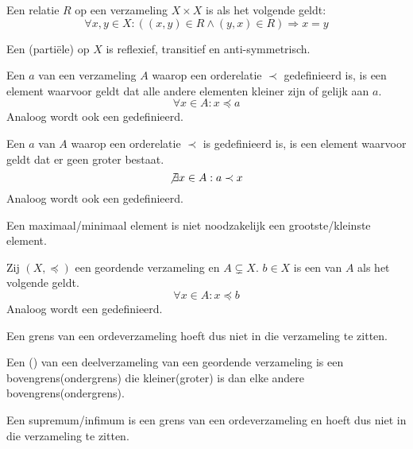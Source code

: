 \documentclass[main.tex]{subfiles}
\begin{document}
\begin{de}
  Een relatie $R$ op een verzameling $X \times X$ is  als het volgende geldt:
  \[ \forall x,y \in X: ((x,y) \in R \wedge (y,x) \in R) \Rightarrow x = y \]
\end{de}

\begin{de}
  Een (parti\"ele)  op $X$ is reflexief, transitief en anti-symmetrisch.
\end{de}

\begin{de}
  Een  $a$ van een verzameling $A$ waarop een orderelatie $\prec$ gedefinieerd is, is een element waarvoor geldt dat alle andere elementen kleiner zijn of gelijk aan $a$.
  \[ \forall x \in A: x \preceq a \] 
  Analoog wordt ook een  gedefinieerd.
\end{de}

\begin{de}
  Een  $a$ van $A$ waarop een orderelatie $\prec$ is gedefinieerd is, is een element waarvoor geldt dat er geen groter bestaat.
  \[ \not\exists x \in A: a \prec x \]
  Analoog wordt ook een  gedefinieerd.
\end{de}

\begin{opm}
  Een maximaal/minimaal element is niet noodzakelijk een grootste/kleinste element.    
\end{opm}

\begin{de}
  Zij $(X,\preceq)$ een geordende verzameling en $A \subsetneq X$.
  $b \in X$ is een  van $A$ als het volgende geldt.
  \[ \forall x \in A: x \preceq b \]
  Analoog wordt een  gedefinieerd.
\end{de}

\begin{opm}
  Een grens van een ordeverzameling hoeft dus niet in die verzameling te zitten.
\end{opm}

\begin{de}
  Een () van een deelverzameling van een geordende verzameling is een bovengrens(ondergrens) die kleiner(groter) is dan elke andere bovengrens(ondergrens).
\end{de}

\begin{opm}
  Een supremum/infimum is een grens van een ordeverzameling en hoeft dus niet in die verzameling te zitten.
\end{opm}
\end{document}
